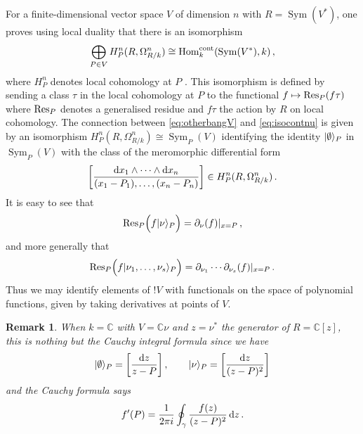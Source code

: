 \documentclass[english,letter paper,12pt,reqno]{article}
\DeclarePairedDelimiter\ket{\lvert}{\rangle}
\theoremstyle{example}
\newtheorem{remark}[theorem]{Remark}
\def\Hom{\operatorname{Hom}}
\def\be{\begin{equation}}
\def\ee{\end{equation}}
\DeclareMathOperator{\Sym}{Sym}
\begin{document}
For a finite-dimensional vector space $V$ of dimension $n$ with $R = \Sym(V^*)$, one proves using local duality \cite[Theorem 2.6]{murfet_coalg} that there is an isomorphism
\be\label{eq:otherbangV}
\bigoplus_{P \in V} H^{n}_{P}(R, \Omega^n_{R/k}) \cong \Hom_k^{\cont}(\Sym(V^*),k) \,,
\ee
where $H^n_P$ denotes local cohomology at $P$ \cite{residuesduality}. This isomorphism is defined by sending a class $\tau$ in the local cohomology at $P$ to the functional $f \mapsto \operatorname{Res}\!_P(f \tau)$ where $\operatorname{Res}\!_P$ denotes a generalised residue and $f \tau$ the action by $R$ on local cohomology. The connection between \eqref{eq:otherbangV} and \eqref{eq:isocontnu} is given by an isomorphism $H^{n}_{P}(R, \Omega^n_{R/k}) \cong \Sym_P(V)$ identifying the identity $\ket{\emptyset}_P$ in $\Sym_P(V)$ with the class of the meromorphic differential form \cite[Definition 2.9]{murfet_coalg}
\be
\left[ \frac{\ud x_1 \wedge \cdots \wedge \ud x_n}{(x_1-P_1), \ldots, (x_n-P_n)} \right] \in H^{n}_{P}(R, \Omega^n_{R/k})\,.
\ee
It is easy to see that 
\begin{equation}\label{eq:residue_differentiates}
\Res_P\Big( f \ket{\nu}_P \Big) = \partial_{\nu}( f )|_{x = P}\,,
\end{equation}
and more generally that \cite[Lemma 2.13]{murfet_coalg}
\begin{equation}\label{eq:residue_differentiates2}
\Res_P\Big( f \ket{\nu_1,\ldots,\nu_s}_P \Big) = \partial_{\nu_1} \cdots \partial_{\nu_s}( f )|_{x = P}\,.
\end{equation}
Thus we may identify elements of ${!} V$ with functionals on the space of polynomial functions, given by taking derivatives at points of $V$.

\begin{remark} When $k = \mathbb{C}$ with $V = \mathbb{C} \nu$ and $z = \nu^*$ the generator of $R = \mathbb{C}[z]$, this is nothing but the Cauchy integral formula since we have
\be
\ket{\emptyset}_P = \left[ \frac{\ud z }{z-P} \right], \qquad \ket{\nu}_P = \left[ \frac{\ud z }{(z-P)^2} \right]
\ee
and the Cauchy formula says
\[
f'(P) = \frac{1}{2 \pi i} \oint_\gamma \frac{f(z)}{(z-P)^2} \operatorname{d}\!{z}\,.
\]
\end{remark}
\end{document}
